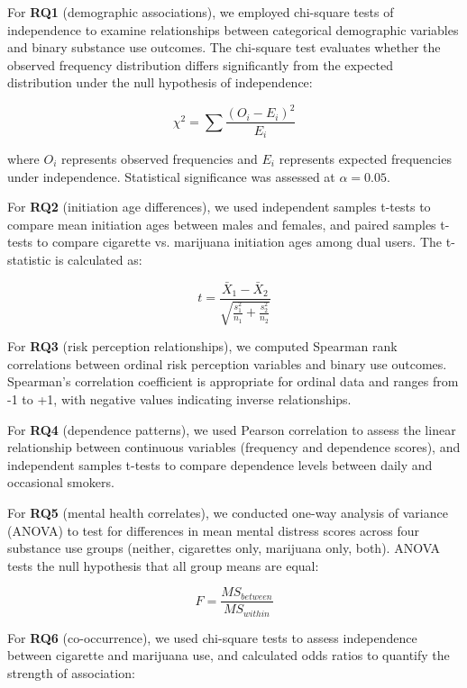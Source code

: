 \documentclass[conference]{IEEEtran}
\begin{document}
For \textbf{RQ1} (demographic associations), we employed chi-square tests of independence to examine relationships between categorical demographic variables and binary substance use outcomes. The chi-square test evaluates whether the observed frequency distribution differs significantly from the expected distribution under the null hypothesis of independence:

\begin{equation}
\chi^2 = \sum \frac{(O_i - E_i)^2}{E_i}
\end{equation}

where $O_i$ represents observed frequencies and $E_i$ represents expected frequencies under independence. Statistical significance was assessed at $\alpha = 0.05$.

For \textbf{RQ2} (initiation age differences), we used independent samples t-tests to compare mean initiation ages between males and females, and paired samples t-tests to compare cigarette vs. marijuana initiation ages among dual users. The t-statistic is calculated as:

\begin{equation}
t = \frac{\bar{X}_1 - \bar{X}_2}{\sqrt{\frac{s_1^2}{n_1} + \frac{s_2^2}{n_2}}}
\end{equation}

For \textbf{RQ3} (risk perception relationships), we computed Spearman rank correlations between ordinal risk perception variables and binary use outcomes. Spearman's correlation coefficient is appropriate for ordinal data and ranges from -1 to +1, with negative values indicating inverse relationships.

For \textbf{RQ4} (dependence patterns), we used Pearson correlation to assess the linear relationship between continuous variables (frequency and dependence scores), and independent samples t-tests to compare dependence levels between daily and occasional smokers.

For \textbf{RQ5} (mental health correlates), we conducted one-way analysis of variance (ANOVA) to test for differences in mean mental distress scores across four substance use groups (neither, cigarettes only, marijuana only, both). ANOVA tests the null hypothesis that all group means are equal:

\begin{equation}
F = \frac{MS_{between}}{MS_{within}}
\end{equation}

For \textbf{RQ6} (co-occurrence), we used chi-square tests to assess independence between cigarette and marijuana use, and calculated odds ratios to quantify the strength of association:
\end{document}

